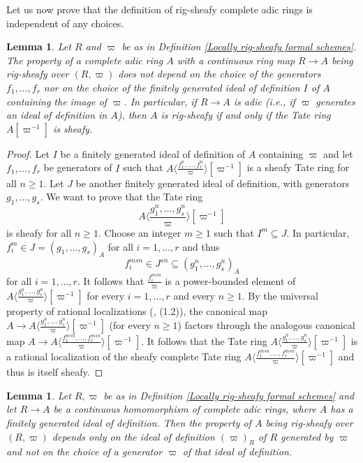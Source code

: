 \documentclass[12pt,twoside,a4paper]{article}
\newtheorem{lemma}[thm]{Lemma}
\theoremstyle{definition}
\theoremstyle{remark}
\begin{document}
Let us now prove that the definition of rig-sheafy complete adic rings is independent of any choices.        
\begin{lemma}\label{Rig-sheafiness does not depend on generators}Let $R$ and $\varpi$ be as in Definition \ref{Locally rig-sheafy formal schemes}. The property of a complete adic ring $A$ with a continuous ring map $R\to A$ being rig-sheafy over $(R, \varpi)$ does not depend on the choice of the generators $f_1,\dots, f_r$ nor on the choice of the finitely generated ideal of definition $I$ of $A$ containing the image of $\varpi$. In particular, if $R\to A$ is adic (i.e., if $\varpi$ generates an ideal of definition in $A$), then $A$ is rig-sheafy if and only if the Tate ring $A[\varpi^{-1}]$ is sheafy.\end{lemma}
\begin{proof}Let $I$ be a finitely generated ideal of definition of $A$ containing $\varpi$ and let $f_1,\dots, f_r$ be generators of $I$ such that $A\langle\frac{f_1^{n},\dots,f_r^{n}}{\varpi}\rangle[\varpi^{-1}]$ is a sheafy Tate ring for all $n\geq1$. Let $J$ be another finitely generated ideal of definition, with generators $g_1,\dots, g_s$. We want to prove that the Tate ring \begin{equation*}A\langle\frac{g_1^{n},\dots,g_s^{n}}{\varpi}\rangle[\varpi^{-1}]\end{equation*}is sheafy for all $n\geq1$. Choose an integer $m\geq1$ such that $I^{m}\subseteq J$. In particular, $f_{i}^{m}\in J=(g_1,\dots, g_s)_{A}$ for all $i=1,\dots,r$ and thus\begin{equation*}f_{i}^{msn}\in J^{sn}\subseteq (g_1^{n},\dots, g_s^{n})_{A}\end{equation*}for all $i=1,\dots,r$. It follows that $\frac{f_{i}^{msn}}{\varpi}$ is a power-bounded element of $A\langle\frac{g_1^{n},\dots,g_s^{n}}{\varpi}\rangle[\varpi^{-1}]$ for every $i=1,\dots, r$ and every $n\geq1$. By the universal property of rational localizations (\cite{Huber2}, (1.2)), the canonical map $A\to A\langle\frac{g_1^{n},\dots,g_s^{n}}{\varpi}\rangle[\varpi^{-1}]$ (for every $n\geq1$) factors through the analogous canonical map $A\to A\langle\frac{f_1^{msn},\dots,f_r^{msn}}{\varpi}\rangle[\varpi^{-1}]$. It follows that the Tate ring $A\langle\frac{g_1^{n},\dots,g_s^{n}}{\varpi}\rangle[\varpi^{-1}]$ is a rational localization of the sheafy complete Tate ring $A\langle\frac{f_1^{msn},\dots,f_r^{msn}}{\varpi}\rangle[\varpi^{-1}]$ and thus is itself sheafy.\end{proof}
\begin{lemma}\label{Rig-sheafiness does not depend on the pseudo-uniformizer}Let $R, \varpi$ be as in Definition \ref{Locally rig-sheafy formal schemes} and let $R\to A$ be a continuous homomorphism of complete adic rings, where $A$ has a finitely generated ideal of definition. Then the property of $A$ being rig-sheafy over $(R, \varpi)$ depends only on the ideal of definition $(\varpi)_{R}$ of $R$ generated by $\varpi$ and not on the choice of a generator $\varpi$ of that ideal of definition.\end{lemma}
\end{document}
